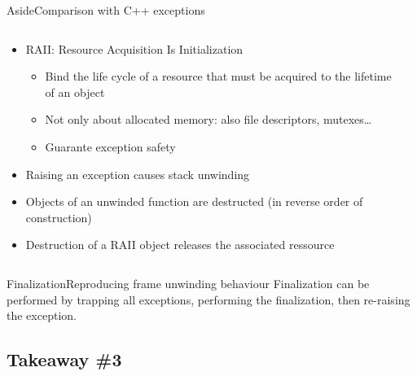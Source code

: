 \begin{frame}{Aside}{Comparison with C++ exceptions}
\begin{columns}
\begin{column}{0.5\textwidth}
\begin{itemize}
\item RAII: Resource Acquisition Is Initialization
\begin{itemize}
\item Bind the life cycle of a resource that must be acquired to the lifetime of an object
\item Not only about allocated memory: also file descriptors, mutexes\dots
\item Guarante exception safety
\end{itemize}
\item Raising an exception causes stack unwinding
\item Objects of an unwinded function are destructed (in reverse order of construction)
\item Destruction of a RAII object releases the associated ressource
\end{itemize}
%
\end{column}
\begin{column}{0.5\textwidth}
\end{column}
\end{columns}
\end{frame}


\begin{frame}{Finalization}{Reproducing frame unwinding behaviour}
Finalization can be performed by trapping all exceptions, performing the finalization, then re-raising the exception. \footnotemark[1]
\bigskip
\centering
{}
\end{frame}


%
%
\subsection*{Takeaway \#3}
\frameSubsectionTakeaway{}



